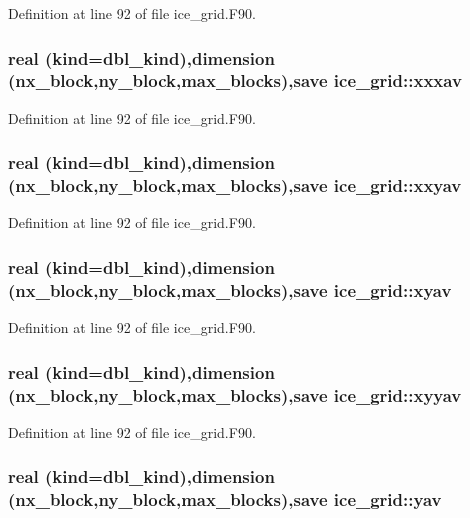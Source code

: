 Definition at line 92 of file ice\_\-grid.F90.\hypertarget{namespaceice__grid_a62131a38b595f37c91ebbec351691ef3}{
\subsubsection[{xxxav}]{\setlength{\rightskip}{0pt plus 5cm}real (kind=dbl\_\-kind),dimension (nx\_\-block,ny\_\-block,max\_\-blocks),save {\bf ice\_\-grid::xxxav}}}
\label{namespaceice__grid_a62131a38b595f37c91ebbec351691ef3}


Definition at line 92 of file ice\_\-grid.F90.\hypertarget{namespaceice__grid_a471e3cdf6d11b7f3831afcdfb354fbfc}{
\subsubsection[{xxyav}]{\setlength{\rightskip}{0pt plus 5cm}real (kind=dbl\_\-kind),dimension (nx\_\-block,ny\_\-block,max\_\-blocks),save {\bf ice\_\-grid::xxyav}}}
\label{namespaceice__grid_a471e3cdf6d11b7f3831afcdfb354fbfc}


Definition at line 92 of file ice\_\-grid.F90.\hypertarget{namespaceice__grid_aa4182840814568ebe32038898cd5a7ad}{
\subsubsection[{xyav}]{\setlength{\rightskip}{0pt plus 5cm}real (kind=dbl\_\-kind),dimension (nx\_\-block,ny\_\-block,max\_\-blocks),save {\bf ice\_\-grid::xyav}}}
\label{namespaceice__grid_aa4182840814568ebe32038898cd5a7ad}


Definition at line 92 of file ice\_\-grid.F90.\hypertarget{namespaceice__grid_ab0c9d28119dfb18bfc26a3f493b2e844}{
\subsubsection[{xyyav}]{\setlength{\rightskip}{0pt plus 5cm}real (kind=dbl\_\-kind),dimension (nx\_\-block,ny\_\-block,max\_\-blocks),save {\bf ice\_\-grid::xyyav}}}
\label{namespaceice__grid_ab0c9d28119dfb18bfc26a3f493b2e844}


Definition at line 92 of file ice\_\-grid.F90.\hypertarget{namespaceice__grid_a637cce7adf54c42ab41eeaf347cf824e}{
\subsubsection[{yav}]{\setlength{\rightskip}{0pt plus 5cm}real (kind=dbl\_\-kind),dimension (nx\_\-block,ny\_\-block,max\_\-blocks),save {\bf ice\_\-grid::yav}}}
\label{namespaceice__grid_a637cce7adf54c42ab41eeaf347cf824e}


